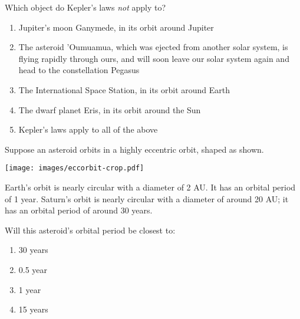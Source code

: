 \documentclass[12pt]{article}
\begin{document}
\begin{enumerate}
\vspace{0.5in}

\begin{minipage}{\textwidth}
\item{Which object do Kepler's laws {\it not} apply to?

\begin{enumerate}[label=(\Alph*)]
\setlength\itemsep{0.0em}
\item{ Jupiter's moon Ganymede, in its orbit around Jupiter }
\item{ The asteroid 'Oumuamua, which was ejected from another solar system, is flying rapidly through ours, and will soon leave  our solar system again and head to the constellation Pegasus }
\item{ The International Space Station, in its orbit around Earth }
\item{ The dwarf planet Eris, in its orbit around the Sun }
\item{ Kepler's laws apply to all of the above }
\end{enumerate}
} %
\end{minipage}


\vspace{0.5in}

\begin{minipage}{\textwidth}
\item{Suppose an asteroid orbits in a highly eccentric orbit, shaped as shown.

\begin{center}
\texttt{[image: images/eccorbit-crop.pdf]}
\end{center}

\bigskip

Earth's orbit is nearly circular with a diameter of 2 AU. It has an orbital period of
1 year. Saturn's orbit is nearly circular with a diameter of around 20 AU; it has
an orbital period of around 30 years.

\bigskip

Will this asteroid's orbital period be closest to:

\begin{enumerate}[label=(\Alph*)]
\setlength\itemsep{0.0em}
\item{ 30 years }
\item{ 0.5 year }
\item{ 1 year }
\item{ 15 years }
\end{enumerate}
} %
\end{minipage}



\end{enumerate}
\end{document}
